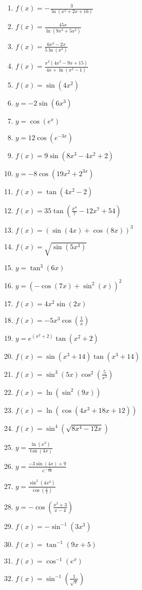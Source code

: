 \documentclass[a4paper,10pt]{article}
\begin{document}
\begin{multicols}{3}
\begin{enumerate}
\item $f(x) = -\frac{3}{\ln(x^2 + 2x + 16)}$
\item $f(x) = \frac{45x}{\ln(9x^3 + 5x^2)}$
\item $f(x) = \frac{6x^3 - 2x}{5\ln(x^4)}$
\item $f(x) = \frac{x^2(4x^2 - 9x + 15)}{4x + \ln(x^2 - 1)}$

\item $f(x) = \sin(4x^2)$
\item $y = -2\sin(6x^3)$
\item $y = \cos(e^x)$
\item $y = 12\cos(e^{-3x})$

\item $f(x) = 9\sin(8x^3 - 4x^2 + 2) $
\item $y = -8\cos(19x^2 + 2^{3x})$
\item $f(x) = \tan(4x^2 - 2)$
\item $f(x) = 35\tan\left(\frac{x^8}{7} - 12x^7 + 54\right)$

\item $f(x) = (\sin(4x) + \cos(8x))^3$
\item $f(x) = \sqrt{\sin(5x^3)}$
\item $y = \tan^3(6x)$
\item $y = (-\cos(7x) + \sin^2(x))^2$

\item $f(x) = 4x^2\sin(2x)$
\item $f(x) = -5x^3\cos\left(\frac{1}{x}\right)$
\item $y = e^{(x^2 + 2)}\tan(x^2 + 2)$
\item $f(x) = \sin(x^3 + 14)\tan(x^3 + 14)$

\item $f(x) = \sin^3(5x)\cos^2\left(\frac{5}{x^2}\right)$
\item $f(x) = \ln(\sin^2(9x))$
\item $f(x) = \ln(\cos(4x^3 + 18x + 12))$
\item $f(x) = \sin^4\left(\sqrt{8x^4 - 12x}\right)$

\item $y = \frac{\ln(x^2)}{\tan(4x)}$
\item $y = \frac{-3\sin(4x) + 9}{e^{-\frac{x}{100}}}$
\item $y = \frac{\sin^3(4x^3)}{\cos\left(\frac{x}{2}\right)}$
\item $y = -\cos\left(\frac{x^2 + 3}{x - 4}\right)$

\item $f(x) = -\sin^{-1}(3x^3)$
\item $f(x) = \tan^{-1}(9x + 5)$
\item $f(x) = \cos^{-1}(e^x)$
\item $f(x) = \sin^{-1}\left(\frac{1}{\sqrt{x}}\right)$


\end{enumerate}
\end{multicols}
\end{document}
